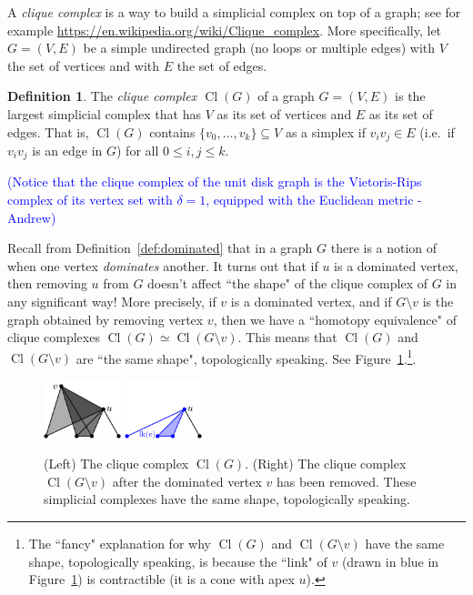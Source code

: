 \documentclass[amscd, amssymb, verbatim]{amsart}[12pt]
\newcommand{\note}[1]{\textcolor{blue}{({#1})}}
\theoremstyle{plain}
\theoremstyle{definition}
\newtheorem{definition}[lemma]{Definition}
\DeclareMathOperator{\cl}{Cl}
\begin{document}
A \emph{clique complex} is a way to build a simplicial complex on top of a graph; see for example \url{https://en.wikipedia.org/wiki/Clique\_complex}.
More specifically, let $G=(V,E)$ be a simple undirected graph (no loops or multiple edges) with $V$ the set of vertices and with $E$ the set of edges.

\begin{definition}
The \emph{clique complex $\cl(G)$} of a graph $G=(V,E)$ is the largest simplicial complex that has $V$ as its set of vertices and $E$ as its set of edges.
That is, $\cl(G)$ contains $\{v_0,\ldots,v_k\}\subseteq V$ as a simplex if $v_iv_j\in E$ (i.e.\ if $v_iv_j$ is an edge in $G$) for all $0\le i,j\le k$.
\end{definition}

\note{Notice that the clique complex of the unit disk graph is the Vietoris-Rips complex of its vertex set with $\delta = 1$, equipped with the Euclidean metric - Andrew}

Recall from Definition~\ref{def:dominated} that in a graph $G$ there is a notion of when one vertex \emph{dominates} another.
It turns out that if $u$ is a dominated vertex, then removing $u$ from $G$ doesn't affect ``the shape" of the clique complex of $G$ in any significant way!
More precisely, if $v$ is a dominated vertex, and if $G\setminus v$ is the graph obtained by removing vertex $v$, then we have a ``homotopy equivalence" of clique complexes $\cl(G)\simeq \cl(G\setminus v)$.
This means that $\cl(G)$ and $\cl(G\setminus v)$ are ``the same shape", topologically speaking.
See Figure~\ref{fig:dominatedClique}.\footnote{The ``fancy" explanation for why $\cl(G)$ and $\cl(G\setminus v)$ have the same shape, topologically speaking, is because the ``link" of $v$ (drawn in blue in Figure~\ref{fig:dominatedClique}) is contractible (it is a cone with apex $u$).}.

\begin{figure}[h]
\centering
\includegraphics[width=0.2\textwidth]{Dominated2_labeled.pdf}
\hspace{20mm}
\includegraphics[width=0.2\textwidth]{Dominated4_labeled.pdf}
\caption{(Left) The clique complex $\cl(G)$. (Right) The clique complex $\cl(G\setminus v)$ after the dominated vertex $v$ has been removed. These simplicial complexes have the same shape, topologically speaking.}
\label{fig:dominatedClique}
\end{figure}
\end{document}
